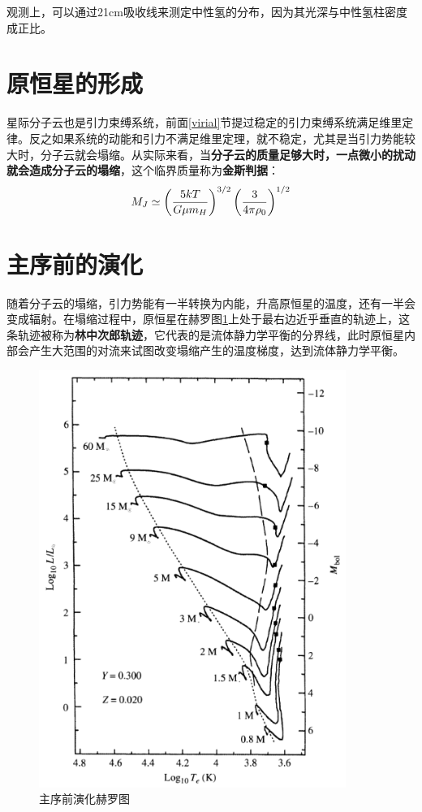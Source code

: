\documentclass[openany]{ctexbook}
\begin{document}
观测上，可以通过21\;cm吸收线来测定中性氢的分布，因为其光深与中性氢柱密度成正比。

\section{原恒星的形成}
星际分子云也是引力束缚系统，前面\ref{virial}节提过稳定的引力束缚系统满足维里定律。反之如果系统的动能和引力不满足维里定理，就不稳定，尤其是当引力势能较大时，分子云就会塌缩。从实际来看，当\textbf{分子云的质量足够大时，一点微小的扰动就会造成分子云的塌缩}，这个临界质量称为\textbf{金斯判据}：
\begin{equation}
  M_J\simeq\left({5kT\over G\mu m_H}\right)^{3/2}\left({3\over 4\pi \rho_0}\right)^{1/2}
\end{equation}

\section{主序前的演化}
随着分子云的塌缩，引力势能有一半转换为内能，升高原恒星的温度，还有一半会变成辐射。在塌缩过程中，原恒星在赫罗图\ref{fig:hayashi}上处于最右边近乎垂直的轨迹上，这条轨迹被称为\textbf{林中次郎轨迹}，它代表的是流体静力学平衡的分界线，此时原恒星内部会产生大范围的对流来试图改变塌缩产生的温度梯度，达到流体静力学平衡。
\begin{figure}[hbt]
  \centering
  \includegraphics[width=10cm]{chapters/12/hayashi}
  \caption{主序前演化赫罗图}
  \label{fig:hayashi}
\end{figure}
\end{document}
